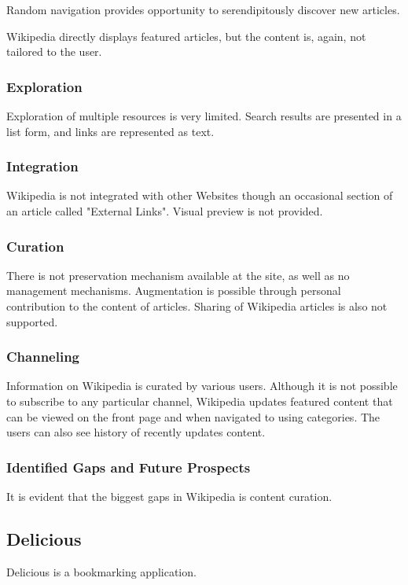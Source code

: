{{{Random navigation provides opportunity to serendipitously discover new articles. 

Wikipedia directly displays featured articles, but the content is, again, not tailored to the user. 
}%
{\subsubsection{Exploration}
Exploration of multiple resources is very limited. Search results are presented in a list form, and links are represented as text. 
}%
{\subsubsection{Integration}
Wikipedia is not integrated with other Websites though an occasional section of an article called "External Links". Visual preview is not provided.
}%
{\subsubsection{Curation}
There is not preservation mechanism available at the site, as well as no management mechanisms. Augmentation is possible through personal contribution to the content of articles.  Sharing of Wikipedia articles is also not supported. 

}%
{\subsubsection{Channeling}
Information on Wikipedia is curated by various users. Although it is not possible to subscribe to any particular channel, Wikipedia updates featured content that can be viewed on the front page and when navigated to using categories. The users can also see history of recently updates content. 
}%
{\subsubsection{Identified Gaps and Future Prospects}
It is evident that the biggest gaps in Wikipedia is content curation. 
}%

} %


{\subsection{Delicious}
Delicious is a bookmarking application. 

}}
